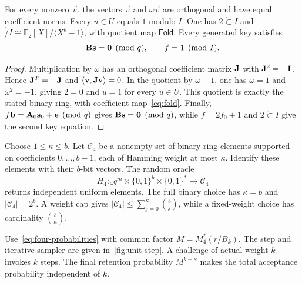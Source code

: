 \begin{lemma}
\label{lem:unit-geometry}
For every nonzero $\vec v$, the vectors $\vec v$ and $\omega\vec v$ are orthogonal and have equal coefficient norms. Every $u\in U$ equals $1$ modulo $I$. One has $2\ring\subset I$ and $\ring/I\cong\mathbb F_2[X]/\langle X^b-1\rangle$, with quotient map $\mathsf{Fold}$. Every generated key satisfies
\[
 \mathbf{B}\mathbf{s}=\mathbf{0}\pmod q,\qquad f=1\pmod I.
\]
\end{lemma}
\begin{proof}
Multiplication by $\omega$ has an orthogonal coefficient matrix $\mathbf{J}$ with $\mathbf{J}^2=-\mathbf{I}$. Hence $\mathbf{J}^T=-\mathbf{J}$ and $\langle \mathbf{v},\mathbf{J}\mathbf{v}\rangle=0$. In the quotient by $\omega-1$, one has $\omega=1$ and $\omega^2=-1$, giving $2=0$ and $u=1$ for every $u\in U$. This quotient is exactly the stated binary ring, with coefficient map~\cref{eq:fold}. Finally, $f\mathbf{b}=\mathbf{A}_0\mathbf{s}_0+\mathbf{e}\pmod q$ gives $\mathbf{B}\mathbf{s}=\mathbf{0}\pmod q$, while $f=2f_0+1$ and $2\ring\subset I$ give the second key equation.
\end{proof}

\begin{definition}
\label{def:folded-challenges}
Choose $1\le\kappa\le b$. Let $\mathcal C_4$ be a nonempty set of binary ring elements supported on coefficients $0,\ldots,b-1$, each of Hamming weight at most $\kappa$. Identify these elements with their $b$-bit vectors. The random oracle
\[
 H_4\colon\ring_q^m\times\{0,1\}^b\times\{0,1\}^*\to\mathcal C_4
\]
returns independent uniform elements. The full binary choice has $\kappa=b$ and $|\mathcal C_4|=2^b$. A weight cap gives $|\mathcal C_4|\le\sum_{j=0}^{\kappa}\binom bj$, while a fixed-weight choice has cardinality $\binom b\kappa$.
\end{definition}

\begin{definition}
\label{def:unit-sampler}
Use~\cref{eq:four-probabilities} with common factor $M=M_4^*(r/B_k)$. The step and iterative sampler are given in~\cref{fig:unit-step}. A challenge of actual weight $k$ invokes $k$ steps. The final retention probability $M^{k-\kappa}$ makes the total acceptance probability independent of $k$.
\end{definition}

